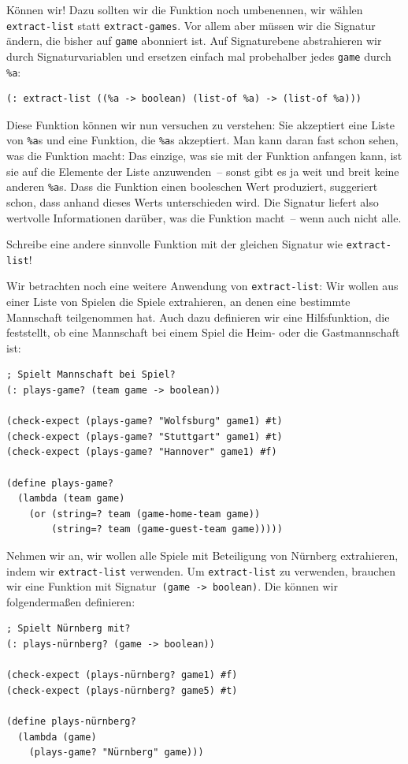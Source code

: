 Können wir! Dazu sollten wir die Funktion noch umbenennen, wir wählen
\lstinline{extract-list} statt \lstinline{extract-games}.  Vor allem
aber müssen wir die Signatur ändern, die bisher auf \lstinline{game}
abonniert ist.  Auf Signaturebene abstrahieren wir durch
Signaturvariablen und ersetzen einfach mal probehalber jedes
\lstinline{game} durch \lstinline{%a}:
%
\begin{lstlisting}
(: extract-list ((%a -> boolean) (list-of %a) -> (list-of %a)))
\end{lstlisting}
%
Diese Funktion können wir nun versuchen zu verstehen: Sie akzeptiert
eine Liste von \lstinline{%a}s und eine Funktion, die \lstinline{%a}s
akzeptiert.  Man kann daran fast schon sehen, was die Funktion macht:
Das einzige, was sie mit der Funktion anfangen kann, ist sie auf die
Elemente der Liste anzuwenden~-- sonst gibt es ja weit und breit keine
anderen \lstinline{%a}s.  Dass die Funktion einen booleschen Wert
produziert, suggeriert schon, dass anhand dieses Werts unterschieden
wird.  Die Signatur liefert also wertvolle Informationen darüber, was
die Funktion macht~-- wenn auch nicht alle.
%
\begin{aufgabeinline}
  Schreibe eine andere sinnvolle Funktion mit der gleichen Signatur
  wie \lstinline{extract-list}!
\end{aufgabeinline}
%
Wir betrachten noch eine weitere Anwendung von
\lstinline{extract-list}: Wir wollen aus einer Liste von Spielen die
Spiele extrahieren, an denen eine bestimmte Mannschaft teilgenommen
hat.  Auch dazu definieren wir eine Hilfsfunktion, die feststellt, ob
eine Mannschaft bei einem Spiel die Heim- oder die Gastmannschaft ist:\label{func:plays-game}
%
\begin{lstlisting}
; Spielt Mannschaft bei Spiel?
(: plays-game? (team game -> boolean))

(check-expect (plays-game? "Wolfsburg" game1) #t)
(check-expect (plays-game? "Stuttgart" game1) #t)
(check-expect (plays-game? "Hannover" game1) #f)

(define plays-game?
  (lambda (team game)
    (or (string=? team (game-home-team game))
        (string=? team (game-guest-team game)))))
\end{lstlisting}
%
Nehmen wir an, wir wollen alle Spiele mit Beteiligung von Nürnberg
extrahieren, indem wir \lstinline{extract-list} verwenden.  Um
\lstinline{extract-list} zu verwenden, brauchen wir eine Funktion mit
Signatur~\lstinline{(game -> boolean)}.  Die können wir folgendermaßen
definieren:
%
\begin{lstlisting}
; Spielt Nürnberg mit?
(: plays-nürnberg? (game -> boolean))

(check-expect (plays-nürnberg? game1) #f)
(check-expect (plays-nürnberg? game5) #t)

(define plays-nürnberg?
  (lambda (game)
    (plays-game? "Nürnberg" game)))
\end{lstlisting}
